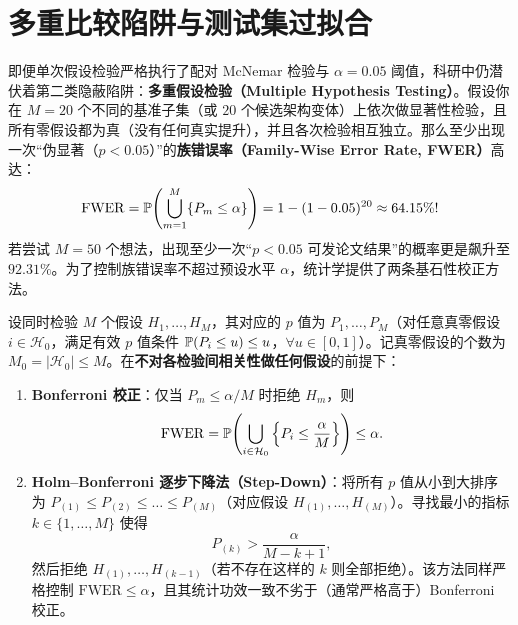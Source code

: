 \section{多重比较陷阱与测试集过拟合}

即便单次假设检验严格执行了配对 McNemar 检验与 $\alpha = 0.05$ 阈值，科研中仍潜伏着第二类隐蔽陷阱：\textbf{多重假设检验（Multiple Hypothesis Testing）}。假设你在 $M = 20$ 个不同的基准子集（或 $20$ 个候选架构变体）上依次做显著性检验，且所有零假设都为真（没有任何真实提升），并且各次检验相互独立。那么至少出现一次“伪显著（$p < 0.05$）”的\textbf{族错误率（Family-Wise Error Rate, FWER）}高达：
\[
  \mathrm{FWER} = \mathbb{P}\!\left(\bigcup_{m=1}^M \{P_m \le \alpha\}\right) = 1 - (1 - 0.05)^{20} \approx 64.15\%!
\]
若尝试 $M = 50$ 个想法，出现至少一次“$p < 0.05$ 可发论文结果”的概率更是飙升至 $92.31\%$。为了控制族错误率不超过预设水平 $\alpha$，统计学提供了两条基石性校正方法。

\begin{thmBox}
\begin{theorem}\label{thm:bonf-holm}
设同时检验 $M$ 个假设 $H_1,\dots,H_M$，其对应的 $p$ 值为 $P_1,\dots,P_M$（对任意真零假设 $i \in \mathcal{H}_0$，满足有效 $p$ 值条件 $\mathbb{P}(P_i \le u) \le u$，$\forall u \in [0,1]$）。记真零假设的个数为 $M_0 = |\mathcal{H}_0| \le M$。在\textbf{不对各检验间相关性做任何假设}的前提下：
\begin{enumerate}
  \item \textbf{Bonferroni 校正}：仅当 $P_m \le \alpha / M$ 时拒绝 $H_m$，则
  \[
    \mathrm{FWER} = \mathbb{P}\!\left(\bigcup_{i\in\mathcal{H}_0} \left\{P_i \le \frac{\alpha}{M}\right\}\right) \le \alpha.
  \]
  \item \textbf{Holm--Bonferroni 逐步下降法（Step-Down）}：将所有 $p$ 值从小到大排序为 $P_{(1)} \le P_{(2)} \le \dots \le P_{(M)}$（对应假设 $H_{(1)},\dots,H_{(M)}$）。寻找最小的指标 $k \in \{1,\dots,M\}$ 使得
  \begin{equation}\label{eq:holm-rule}
    P_{(k)} > \frac{\alpha}{M - k + 1},
  \end{equation}
  然后拒绝 $H_{(1)},\dots,H_{(k-1)}$（若不存在这样的 $k$ 则全部拒绝）。该方法同样严格控制 $\mathrm{FWER} \le \alpha$，且其统计功效一致不劣于（通常严格高于）Bonferroni 校正。
\end{enumerate}
\end{theorem}
\end{thmBox}

